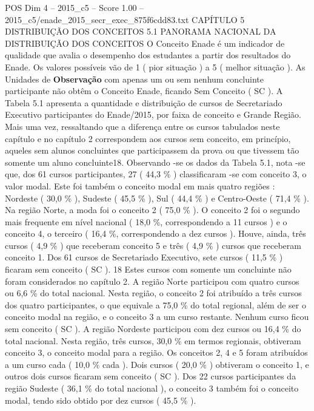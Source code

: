 \begin{textsample}{POS Dim 4 – 2015\_c5 – Score 1.00 – 2015\_c5/enade\_2015\_secr\_exec\_875f6cdd83.txt}  \label{ex:f4_pos_169}
CAPÍTULO 5 DISTRIBUIÇÃO DOS CONCEITOS 5.1 PANORAMA NACIONAL DA DISTRIBUIÇÃO DOS CONCEITOS O Conceito Enade é um indicador de qualidade que avalia o desempenho dos estudantes a partir dos resultados do Enade.
Os valores possíveis vão de 1 ( pior situação ) a 5 ( melhor situação ).
As Unidades de \textbf{Observação} com apenas um ou sem nenhum concluinte participante não obtêm o Conceito Enade, ficando Sem Conceito ( SC ).
A Tabela 5.1 apresenta a quantidade e distribuição de cursos de Secretariado Executivo participantes do Enade/2015, por faixa de conceito e Grande Região.
Mais uma vez, ressaltando que a diferença entre os cursos tabulados neste capítulo e no capítulo 2 correspondem aos cursos sem conceito, em princípio, aqueles sem alunos concluintes que participassem da prova ou que tivessem tão somente um aluno concluinte18.
Observando -se os dados da Tabela 5.1, nota -se que, dos 61 cursos participantes, 27 ( 44,3 \% ) classificaram -se com conceito 3, o valor modal.
Este foi também o conceito modal em mais quatro regiões : Nordeste ( 30,0 \% ), Sudeste ( 45,5 \% ), Sul ( 44,4 \% ) e Centro-Oeste ( 71,4 \% ).
Na região Norte, a moda foi o conceito 2 ( 75,0 \% ).
O conceito 2 foi o segundo mais frequente em nível nacional ( 18,0 \%, correspondendo a 11 cursos ) e o conceito 4, o terceiro ( 16,4 \%, correspondendo a dez cursos ).
Houve, ainda, três cursos ( 4,9 \% ) que receberam conceito 5 e três ( 4,9 \% ) cursos que receberam conceito 1.
Dos 61 cursos de Secretariado Executivo, sete cursos ( 11,5 \% ) ficaram sem conceito ( SC ). 18 Estes cursos com somente um concluinte não foram considerados no capítulo 2.
A região Norte participou com quatro cursos ou 6,6 \% do total nacional.
Nesta região, o conceito 2 foi atribuído a três cursos dos quatro participantes, o que equivale a 75,0 \% do total regional, além de ser o conceito modal na região, e o conceito 3 a um curso restante.
Nenhum curso ficou sem conceito ( SC ).
A região Nordeste participou com dez cursos ou 16,4 \% do total nacional.
Nesta região, três cursos, 30,0 \% em termos regionais, obtiveram conceito 3, o conceito modal para a região.
Os conceitos 2, 4 e 5 foram atribuídos a um curso cada ( 10,0 \% cada ).
Dois cursos ( 20,0 \% ) obtiveram o conceito 1, e outros dois cursos ficaram sem conceito ( SC ).
Dos 22 cursos participantes da região Sudeste ( 36,1 \% do total nacional ), o conceito 3 também foi o conceito modal, tendo sido obtido por dez cursos ( 45,5 \% ).

\end{textsample}
